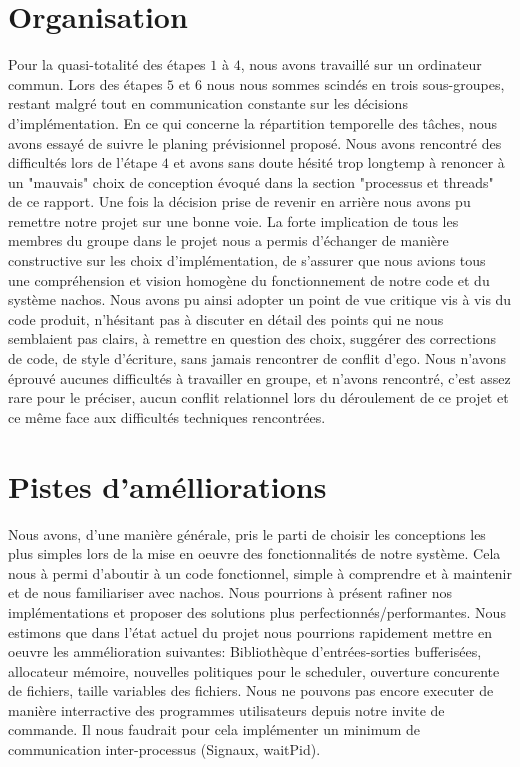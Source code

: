 \documentclass[11pt]{article}
\theoremstyle{definition}
\theoremstyle{definition}
\begin{document}
\section{Organisation}
Pour la quasi-totalité des étapes $1$ à $4$, nous avons travaillé sur un ordinateur commun.
Lors des étapes $5$ et $6$ nous nous sommes scindés en trois sous-groupes, restant malgré tout en communication constante sur les décisions d'implémentation. En ce qui concerne la répartition temporelle des tâches, nous avons essayé de suivre le planing prévisionnel proposé. Nous avons rencontré des difficultés lors de l'étape $4$ et avons sans doute hésité trop longtemp à renoncer à un "mauvais" choix de conception évoqué dans la section "processus et threads" de ce rapport. Une fois la décision prise de revenir en arrière nous avons pu remettre notre projet sur une bonne voie.
La forte implication de tous les membres du groupe dans le projet nous a permis d'échanger de manière constructive sur les choix d'implémentation, de s'assurer que nous avions tous une compréhension et vision homogène du fonctionnement de notre code et du système nachos. Nous avons pu ainsi adopter un point de vue critique vis à vis du code produit, n'hésitant pas à discuter en détail des points qui ne nous semblaient pas clairs, à remettre en question des choix,
suggérer des corrections de code, de style d'écriture, sans jamais rencontrer de conflit d'ego. Nous n'avons éprouvé aucunes difficultés à travailler en groupe, et n'avons rencontré, c'est assez rare pour le préciser, aucun conflit relationnel lors du déroulement de ce projet et ce même face aux difficultés techniques rencontrées.  

\section{Pistes d'amélliorations}
Nous avons, d'une manière générale, pris le parti de choisir les conceptions les plus simples
lors de la mise en oeuvre des fonctionnalités de notre système. Cela nous à permi d'aboutir
à un code fonctionnel, simple à comprendre et à maintenir et de nous familiariser avec nachos.
Nous pourrions à présent rafiner nos implémentations et proposer des solutions plus perfectionnés/performantes.
Nous estimons que dans l'état actuel du projet nous pourrions rapidement mettre en oeuvre les ammélioration suivantes:
Bibliothèque d'entrées-sorties bufferisées, allocateur mémoire, nouvelles politiques pour le scheduler, ouverture concurente de fichiers, taille variables des fichiers.
Nous ne pouvons pas encore executer de manière interractive des programmes utilisateurs depuis notre invite de commande. Il nous faudrait pour cela implémenter un minimum de communication inter-processus (Signaux, waitPid).
\end{document}

